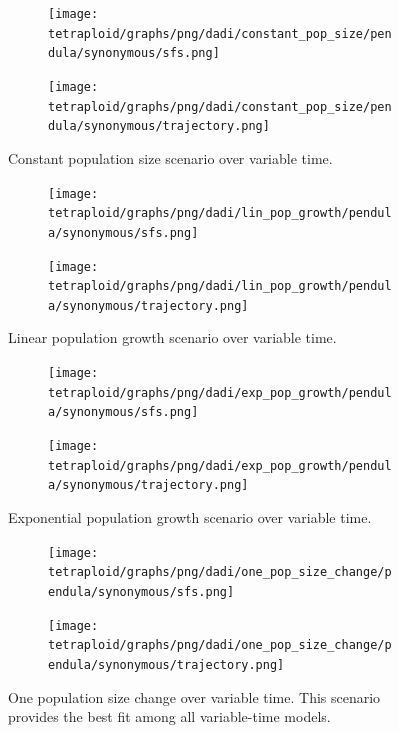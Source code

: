 \documentclass[hidelinks,11pt]{article}
\begin{document}
    \begin{figure}[H]
        \centering
        \begin{subfigure}[b]{0.465\textwidth}
            \texttt{[image: tetraploid/graphs/png/dadi/constant\_pop\_size/pendula/synonymous/sfs.png]}
        \end{subfigure}
        \hfill
        \begin{subfigure}[b]{0.525\textwidth}
            \texttt{[image: tetraploid/graphs/png/dadi/constant\_pop\_size/pendula/synonymous/trajectory.png]}
        \end{subfigure}
        \caption{Constant population size scenario over variable time.}
        \label{fig:constant_pop_size_pendula}
    \end{figure}

    \begin{figure}[H]
        \centering
        \begin{subfigure}[b]{0.465\textwidth}
            \texttt{[image: tetraploid/graphs/png/dadi/lin\_pop\_growth/pendula/synonymous/sfs.png]}
        \end{subfigure}
        \hfill
        \begin{subfigure}[b]{0.525\textwidth}
            \texttt{[image: tetraploid/graphs/png/dadi/lin\_pop\_growth/pendula/synonymous/trajectory.png]}
        \end{subfigure}
        \caption{Linear population growth scenario over variable time.}
        \label{fig:lin_pop_growth_pendula}
    \end{figure}

    \begin{figure}[H]
        \centering
        \begin{subfigure}[b]{0.465\textwidth}
            \texttt{[image: tetraploid/graphs/png/dadi/exp\_pop\_growth/pendula/synonymous/sfs.png]}
        \end{subfigure}
        \hfill
        \begin{subfigure}[b]{0.525\textwidth}
            \texttt{[image: tetraploid/graphs/png/dadi/exp\_pop\_growth/pendula/synonymous/trajectory.png]}
        \end{subfigure}
        \caption{Exponential population growth scenario over variable time.}
        \label{fig:exp_pop_growth_pendula}
    \end{figure}

    \begin{figure}[H]
        \centering
        \begin{subfigure}[b]{0.465\textwidth}
            \texttt{[image: tetraploid/graphs/png/dadi/one\_pop\_size\_change/pendula/synonymous/sfs.png]}
        \end{subfigure}
        \hfill
        \begin{subfigure}[b]{0.525\textwidth}
            \texttt{[image: tetraploid/graphs/png/dadi/one\_pop\_size\_change/pendula/synonymous/trajectory.png]}
        \end{subfigure}
        \caption{One population size change over variable time. This scenario provides the best fit among all variable-time models.}
        \label{fig:one_pop_size_change_pendula}
    \end{figure}
\end{document}
